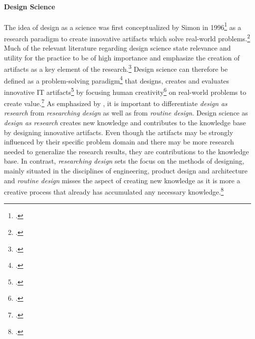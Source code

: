 
\paragraph{Design Science}
The idea of design as a science was first conceptualized by Simon in 1996\footcite[Cf.][]{Simonsciencesartificial1996} as a research paradigm to create innovative artifacts which solve real-world problems.\footcite[Cf.][p.9]{HevnerDesignResearchInformation2010}
Much of the relevant literature regarding design science state relevance and utility for the practice to be of high importance and emphasize the creation of artifacts as a key element of the research.\footcites[Cf.][p.253, 254]{MarchDesignnaturalscience1995}[cf.][p.9, 11]{HevnerDesignResearchInformation2010}[cf.][p.77]{HevnerDesignScienceResearch2004}[cf.][p.1]{PapalambrosDesignScienceWhy2015}[cf.][p.330,342]{GregorPositioningpresentingdesign2013} Design science can therefore be defined as a problem-solving paradigm\footcite[Cf.][p.77]{HevnerDesignScienceResearch2004} that designs, creates and evaluates innovative IT artifacts\footcite[Cf.][p.90]{HevnerDesignScienceResearch2004} by focusing human creativity\footcite[Cf.][p.13]{HevnerDesignResearchInformation2010} on real-world problems to create value.\footcite[Cf.][p.1]{PapalambrosDesignScienceWhy2015} As emphasized by \cite{HevnerDesignResearchInformation2010}, it is important to differentiate \textit{design as research} from \textit{researching design} as well as from \textit{routine design}. Design science as \textit{design as research} creates new knowledge and contributes to the knowledge base by designing innovative artifacts. Even though the artifacts may be strongly influenced by their specific problem domain and there may be more research needed to generalize the research results, they are contributions to the knowledge base. In contrast, \textit{researching design} sets the focus on the methods of designing, mainly situated in the disciplines of engineering, product design and architecture and \textit{routine design} misses the aspect of creating new knowledge as it is more a creative process that already has accumulated any necessary knowledge.\footcite[Cf.][pp.15 ]{HevnerDesignResearchInformation2010}


